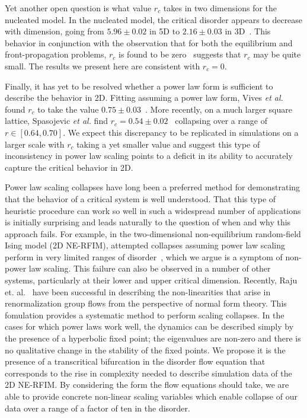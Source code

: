 \documentclass[reprint,amsmath,amssymb,aps,floatfix]{revtex4-1}
\begin{document}
%
Yet another open question is what value $r_c$ takes in two dimensions for the nucleated model. In the nucleated model, the critical disorder appears to decrease with dimension, going from $5.96 \pm 0.02$ in 5D to $2.16 \pm 0.03$ in 3D~\cite{Sethna06}. This behavior in conjunction with the observation that for both the equilibrium and front-propagation problems, $r_c$ is found to be zero~\cite{Drossel98} suggests that $r_c$ may be quite small. The results we present here are consistent with $r_c=0$.\par
%
Finally, it has yet to be resolved whether a power law form is sufficient to describe the behavior in 2D.  Fitting assuming a power law form, Vives {\em et al.} found $r_c$ to take the value $0.75 \pm 0.03$~\cite{Vives95}. More recently, on a much larger square lattice, Spasojevic {\em et al.} find $r_c=0.54\pm0.02$~\cite{Spasojevic11, Spasojevic11-2} collapsing over a range of $r \in [0.64, 0.70]$. We expect this discrepancy to be replicated in simulations on a larger scale with $r_c$ taking a yet smaller value and suggest this type of inconsistency in power law scaling points to a deficit in its ability to accurately capture the critical behavior in 2D.\par
%
Power law scaling collapses have long been a preferred method for demonstrating that the behavior of a critical system is well understood. That this type of heuristic procedure can work so well in such a widespread number of applications is initially surprising and leads naturally to the question of when and why this approach fails. For example, in the two-dimensional non-equilibrium random-field Ising model (2D NE-RFIM),  attempted collapses assuming power law scaling perform in very limited ranges of disorder~\cite{Spasojevic11, Spasojevic11-2, Perkovic96, KuntzPhD}, which we argue is a symptom of non-power law scaling. This failure can also be observed in a number of other systems, particularly at their lower and upper critical dimension. Recently, Raju et. al.~\cite{Raju17} have been successful in describing the non-linearities that arise in renormalization group flows from the perspective of normal form theory. This fomulation provides a systematic method to perform scaling collapses. In the cases for which power laws work well, the dynamics can be described simply by the presence of a hyperbolic fixed point; the eigenvalues are non-zero and there is no qualitative change in the stability of the fixed points. We propose it is the presence of a transcritical bifurcation in the disorder flow equation that corresponds to the rise in complexity needed to describe simulation data of the 2D NE-RFIM. By considering the form the flow equations should take, we are able to provide concrete non-linear scaling variables which enable collapse of our data over a range of a factor of ten in the disorder.\par
\end{document}
